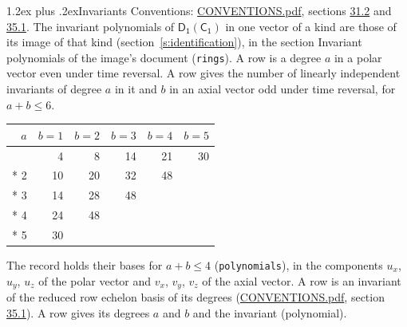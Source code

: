 \documentclass[10pt,a4paper]{article}
\makeatletter
\renewcommand\section{\@startsection{section}{1}{\z@}{-3ex plus -1ex minus -.2ex}%
  {1.2ex plus .2ex}{\normalfont\large\sffamily\bfseries\color{parttitle}}}
\numberwithin{equation}{section}
\newcommand{\grp}[1]{\mathsf{#1}}
\makeatother
\begin{document}
\section{Invariants}\label{s:invariants}
Conventions: \href{../../CONVENTIONS.pdf}{CONVENTIONS.pdf}, sections \href{../../CONVENTIONS.pdf\#conv.31.2}{31.2} and \href{../../CONVENTIONS.pdf\#conv.35.1}{35.1}.
The invariant polynomials of $\grp{D_{1}}(\grp{C_{1}})$ in one vector of a kind are those of its image of that kind (section~\ref{s:identification}), in the section Invariant polynomials of the image's document (\texttt{rings}).
\leavevmode\label{n:index.degree.polar}\label{n:index.degree.axial}A row is a degree $a$ in a polar vector even under time reversal. A row gives the number of linearly independent invariants of degree $a$ in it and $b$ in an axial vector odd under time reversal, for $a + b \le 6$.
{\small\begin{longtable}{@{}rrrrrr@{}}\toprule
$a$ & $b = 1$ & $b = 2$ & $b = 3$ & $b = 4$ & $b = 5$\\\midrule\endhead
\bottomrule\endfoot\endlastfoot
1 & 4 & 8 & 14 & 21 & 30\\*
2 & 10 & 20 & 32 & 48 & \\*
3 & 14 & 28 & 48 &  & \\*
4 & 24 & 48 &  &  & \\*
5 & 30 &  &  &  & \\
\bottomrule\end{longtable}}
\leavevmode\label{n:local.component.polar}\label{n:local.component.axial}The record holds their bases for $a + b \le 4$ (\texttt{polynomials}), in the components $u_{x}$, $u_{y}$, $u_{z}$ of the polar vector and $v_{x}$, $v_{y}$, $v_{z}$ of the axial vector. \label{n:head.polynomial}A row is an invariant of the reduced row echelon basis of its degrees (\href{../../CONVENTIONS.pdf}{CONVENTIONS.pdf}, section \href{../../CONVENTIONS.pdf\#conv.35.1}{35.1}). A row gives its degrees $a$ and $b$ and the invariant (polynomial).
\end{document}
